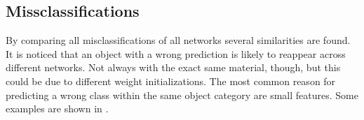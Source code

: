 \subsection{Missclassifications}
\label{sec:predictions-misclassifications}
%
%
%
%
By comparing all misclassifications of all networks several similarities are found.
It is noticed that an object with a wrong prediction is likely to reappear across different networks.
Not always with the exact same material, though, but this could be due to different weight initializations.
The most common reason for predicting a wrong class within the same object category are small features.
Some examples are shown in .
